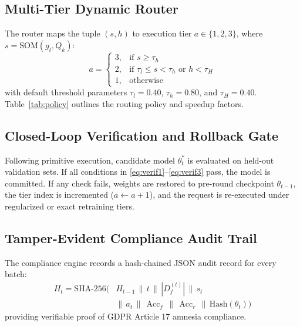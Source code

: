\documentclass[conference]{IEEEtran}
\DeclareMathOperator{\Acc}{Acc}
\begin{document}
\subsection{Multi-Tier Dynamic Router}
The router maps the tuple $(s, h)$ to execution tier $a \in \{1, 2, 3\}$, where $s = \text{SOM}(g_t, Q_k)$:
\begin{equation}
a = \begin{cases}
3, & \text{if } s \ge \tau_h \\
2, & \text{if } \tau_l \le s < \tau_h \text{ or } h < \tau_H \\
1, & \text{otherwise}
\end{cases} \label{eq:router}
\end{equation}
with default threshold parameters $\tau_l = 0.40$, $\tau_h = 0.80$, and $\tau_H = 0.40$. Table~\ref{tab:policy} outlines the routing policy and speedup factors.

\begin{table}[htbp]
\caption{ASUC-SOM Tiered Routing Policy}
\label{tab:policy}
\centering
{}
\end{table}

\subsection{Closed-Loop Verification and Rollback Gate}
Following primitive execution, candidate model $\theta_t^*$ is evaluated on held-out validation sets. If all conditions in \eqref{eq:verif1}--\eqref{eq:verif3} pass, the model is committed. If any check fails, weights are restored to pre-round checkpoint $\theta_{t-1}$, the tier index is incremented ($a \leftarrow a + 1$), and the request is re-executed under regularized or exact retraining tiers.

\subsection{Tamper-Evident Compliance Audit Trail}
The compliance engine records a hash-chained JSON audit record for every batch:
\begin{equation}
\begin{aligned}
H_t = \text{SHA-256}\big( &H_{t-1} \,\|\, t \,\|\, |D_f^{(t)}| \,\|\, s_t \\
&\|\, a_t \,\|\, \Acc_f \,\|\, \Acc_r \,\|\, \text{Hash}(\theta_t)\big)
\end{aligned}
\end{equation}
providing verifiable proof of GDPR Article 17 amnesia compliance.
\end{document}
